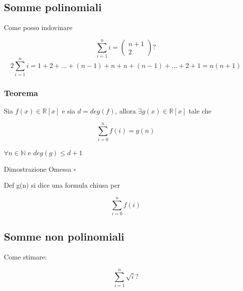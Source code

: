 \documentclass{article}
\begin{document}
        \subsection{Somme polinomiali}
        \begin{flushleft}
          Come posso indovinare
        \end{flushleft}
        \begin{equation}
          \sum^n_{i=1}i=\begin{pmatrix}
            n+1 \\ 
            2
          \end{pmatrix}?
        \end{equation}
        \begin{equation}
          2\sum^n_{i=1}i=1+2+...+(n-1)+n+n+(n-1)+...+2+1=n(n+1)
        \end{equation}
        \subsubsection{Teorema}
        \begin{flushleft}
          Sia $f(x) \in \mathbb{R}[x]$ e sia $d=deg(f)$, allora $\exists g(x)\in \mathbb{R}[x]$ tale che
        \end{flushleft}
        \begin{equation}
          \sum_{i=0}^n f(i)=g(n)
        \end{equation}
        \begin{flushleft}
          $\forall n \in \mathbb{N}$ e $deg(g) \leq d+1$
        \end{flushleft}
        \begin{flushleft}
          Dimostrazione Omessa $\square$
        \end{flushleft}
        \begin{flushleft}
          Def g(n) si dice una formula chiusa per
        \end{flushleft}
        \begin{equation}
          \sum_{i=0}^n f(i)
        \end{equation}
        \subsection{Somme non polinomiali}
        \begin{flushleft}
          Come stimare:
        \end{flushleft}
        \begin{equation*}
          \sum_{i=1}^n \sqrt{i} ?
        \end{equation*}
\end{document}
